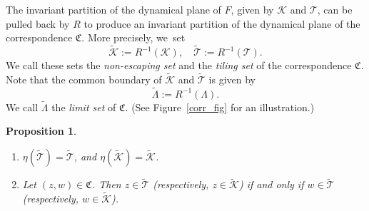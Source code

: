 \documentclass[JEP,XML,SOM,Unicode,NoFloatCountersInSection,published]{cedram}
\newtheorem{proposition}[lemma]{Proposition}
\theoremstyle{definition}
\theoremstyle{remark}
\newcommand{\cT}{\mathcal{T}}
\newcommand{\cK}{\mathcal{K}}
\begin{document}
The invariant partition of the dynamical plane of $F$, given by $\mathcal{K}$ and $\cT$, can be pulled back by $R$ to produce an invariant partition of the dynamical plane of the correspondence $\mathfrak{C}$. More precisely, we~set
\[
\widetilde{\mathcal{K}}:=R^{-1}(\mathcal{K}),\quad \widetilde{\cT}:= R^{-1}(\cT).
\]
We call these sets the \emph{non-escaping set} and the \emph{tiling set} of the correspondence $\mathfrak{C}$.
Note that the common boundary of $\widetilde{\mathcal{K}}$ and $\widetilde{\mathcal{T}}$ is given by
\[
\widetilde{\Lambda}:=R^{-1}(\Lambda).
\]
We call $\widetilde{\Lambda}$ the \emph{limit set} of $\mathfrak{C}$. (See Figure~\ref{corr_fig} for an illustration.)

\skpt
\begin{proposition}\label{corr_partition_1_prop}
\begin{enumerate}
\item $\eta(\widetilde{\cT})=\widetilde{\cT}$, and $\eta(\widetilde{\cK})=\widetilde{\cK}$.

\item Let $(z,w)\in\mathfrak{C}$. Then $z\in\widetilde{\cT}$ (respectively, $z\in\widetilde{\mathcal{K}}$) if and only if $w\in\widetilde{\cT}$ (respectively, $w\in\widetilde{\mathcal{K}}$).
\end{enumerate}
\end{proposition}
\end{document}
